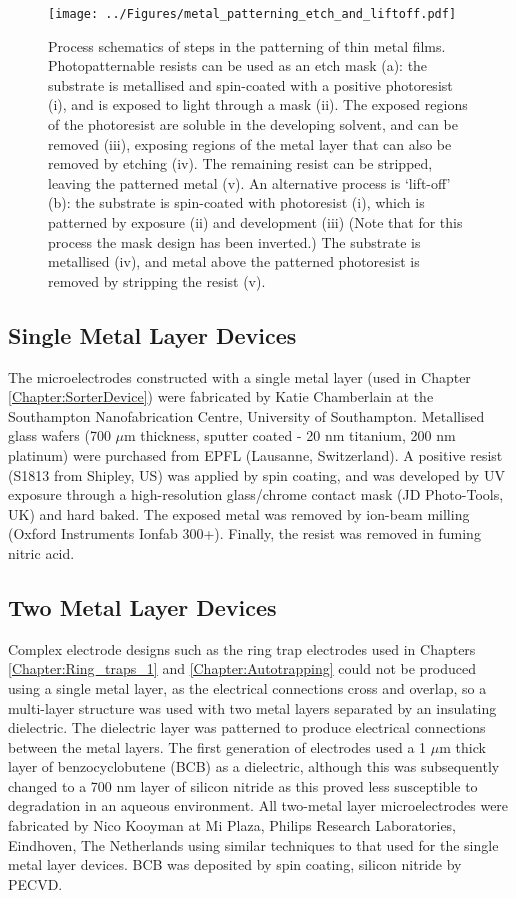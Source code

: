 \begin{figure}
	\centering
		\texttt{[image: ../Figures/metal\_patterning\_etch\_and\_liftoff.pdf]}
	\caption[Process schematics of steps in the patterning of thin metal films.]{Process schematics of steps in the patterning of thin metal films. Photopatternable resists can be used as an etch mask (a): the substrate is metallised and spin-coated with a positive photoresist (i), and is exposed to light through a mask (ii). The exposed regions of the photoresist are soluble in the developing solvent, and can be removed (iii), exposing regions of the metal layer that can also be removed by etching (iv). The remaining resist can be stripped, leaving the patterned metal (v). An alternative process is `lift-off' (b): the substrate is spin-coated with photoresist (i), which is patterned by exposure (ii) and development (iii) (Note that for this process the mask design has been inverted.) The substrate is metallised (iv), and metal above the patterned photoresist is removed by stripping the resist (v).}
	\label{fig:metal_patterning_etch_and_liftoff}
\end{figure}

\subsection{Single Metal Layer Devices}
\label{sec:single_metal_electrode_fabrication}
The microelectrodes constructed with a single metal layer (used in Chapter \ref{Chapter:SorterDevice}) were fabricated by Katie Chamberlain at the Southampton Nanofabrication Centre, University of Southampton. Metallised glass wafers (700 $\mu$m thickness, sputter coated - 20 nm titanium, 200 nm platinum) were purchased from EPFL (Lausanne, Switzerland). A positive resist (S1813 from Shipley, US) was applied by spin coating, and was developed by UV exposure through a high-resolution glass/chrome contact mask (JD Photo-Tools, UK) and hard baked. The exposed metal was removed by ion-beam milling (Oxford Instruments Ionfab 300+). Finally, the resist was removed in fuming nitric acid.

\subsection{Two Metal Layer Devices}

Complex electrode designs such as the ring trap electrodes used in Chapters \ref{Chapter:Ring_traps_1} and \ref{Chapter:Autotrapping} could not be produced using a single metal layer, as the electrical connections cross and overlap, so a multi-layer structure was used with two metal layers separated by an insulating dielectric. The dielectric layer was patterned to produce electrical connections between the metal layers. The first generation of electrodes used a 1 $\mu$m thick layer of benzocyclobutene (BCB) as a dielectric, although this was subsequently changed to a 700 nm layer of silicon nitride as this proved less susceptible to degradation in an aqueous environment. All two-metal layer microelectrodes were fabricated by Nico Kooyman at Mi Plaza, Philips Research Laboratories, Eindhoven, The Netherlands using similar techniques to that used for the single metal layer devices. BCB was deposited by spin coating, silicon nitride by PECVD.

